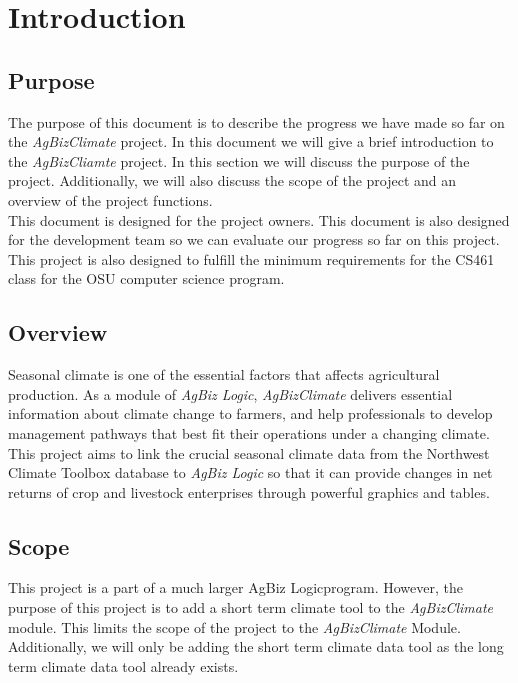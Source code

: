 \documentclass[onecolumn, draftclsnofoot,10pt, compsoc]{article}
\begin{document}
\section{Introduction}
	\subsection{Purpose}
		The purpose of this document is to describe the progress we have made so far on the \textit{AgBizClimate} project. In this document we will give a brief introduction to the \textit{AgBizCliamte} project. In this section we will discuss the purpose of the project. Additionally, we will also discuss the scope of the project and an overview of the project functions.\\
		This document is designed for the project owners. This document is also designed for the development team so we can evaluate our progress so far on this project. This project is also designed to fulfill the minimum requirements for the CS461 class for the OSU computer science program.\\
		
				\subsection{Overview}
			Seasonal climate is one of the essential factors that affects agricultural production. As a module of \textit{AgBiz Logic}, \textit{AgBizClimate} delivers essential information about climate change to farmers, and help professionals to develop management pathways that best fit their operations under a changing climate. This project aims to link the crucial seasonal climate data from the Northwest Climate Toolbox database to \textit{AgBiz Logic} so that it can provide changes in net returns of crop and livestock enterprises through powerful graphics and tables.\\

		\subsection{Scope}
			This project is a part of a much larger AgBiz Logic\texttrademark program. However, the purpose of this project is to add a short term climate tool to the \textit{AgBizClimate} module. This limits the scope of the project to the \textit{AgBizClimate} Module. Additionally, we will only be adding the short term climate data tool as the long term climate data tool already exists.\\
\end{document}
